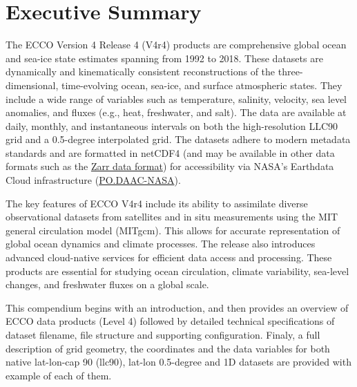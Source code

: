 \pagebreak\section{Executive Summary}
\par \vspace{0.5cm}

The ECCO Version 4 Release 4 (V4r4) products are comprehensive global ocean and sea-ice state estimates spanning 
from 1992 to 2018. These datasets are dynamically and kinematically consistent reconstructions of the three-dimensional, 
time-evolving ocean, sea-ice, and surface atmospheric states. They include a wide range of variables such as temperature, 
salinity, velocity, sea level anomalies, and fluxes (e.g., heat, freshwater, and salt). The data are available at daily, 
monthly, and instantaneous intervals on both the high-resolution LLC90 grid and a 0.5-degree interpolated grid. The datasets 
adhere to modern metadata standards and are formatted in netCDF4 (and may be available in other data formats such as the
\href{https://en.wikipedia.org/wiki/Zarr_(data_format)}{Zarr data format}) for accessibility via NASA's 
Earthdata Cloud infrastructure (\href{https://podaac.jpl.nasa.gov/}{PO.DAAC-NASA}).

The key features of ECCO V4r4 include its ability to assimilate diverse observational datasets from satellites 
and in situ measurements using the MIT general circulation model (MITgcm). This allows for accurate representation 
of global ocean dynamics and climate processes. The release also introduces advanced cloud-native services for efficient 
data access and processing. These products are essential for studying ocean circulation, climate variability, sea-level 
changes, and freshwater fluxes on a global scale.

This compendium begins with an introduction, and then provides an
overview of ECCO data products (Level 4) followed by detailed technical specifications of dataset filename, 
file structure and supporting configuration. Finaly, a full description of grid geometry, the coordinates and the 
data variables for both native lat-lon-cap 90 (llc90), lat-lon 0.5-degree and 1D datasets are provided with example of each of them.

